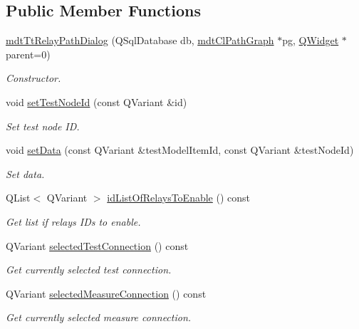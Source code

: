\subsection*{Public Member Functions}
\begin{DoxyCompactItemize}
\item 
\hyperlink{classmdt_tt_relay_path_dialog_a985f0940fd360d21c8cbcb89119ab916}{mdt\-Tt\-Relay\-Path\-Dialog} (Q\-Sql\-Database db, \hyperlink{classmdt_cl_path_graph}{mdt\-Cl\-Path\-Graph} $\ast$pg, \hyperlink{class_q_widget}{Q\-Widget} $\ast$parent=0)
\begin{DoxyCompactList}\small\item\em Constructor. \end{DoxyCompactList}\item 
void \hyperlink{classmdt_tt_relay_path_dialog_a0047cfd2fea5de76b8a9bf26a67ee45a}{set\-Test\-Node\-Id} (const Q\-Variant \&id)
\begin{DoxyCompactList}\small\item\em Set test node I\-D. \end{DoxyCompactList}\item 
void \hyperlink{classmdt_tt_relay_path_dialog_a188683b80701b54c0691d99bd3e8fe68}{set\-Data} (const Q\-Variant \&test\-Model\-Item\-Id, const Q\-Variant \&test\-Node\-Id)
\begin{DoxyCompactList}\small\item\em Set data. \end{DoxyCompactList}\item 
Q\-List$<$ Q\-Variant $>$ \hyperlink{classmdt_tt_relay_path_dialog_a540948fa111834c1abadafc71048f07c}{id\-List\-Of\-Relays\-To\-Enable} () const 
\begin{DoxyCompactList}\small\item\em Get list if relays I\-Ds to enable. \end{DoxyCompactList}\item 
Q\-Variant \hyperlink{classmdt_tt_relay_path_dialog_a6e9667d6626b6f4d0f87aa3b48bc598e}{selected\-Test\-Connection} () const 
\begin{DoxyCompactList}\small\item\em Get currently selected test connection. \end{DoxyCompactList}\item 
Q\-Variant \hyperlink{classmdt_tt_relay_path_dialog_a8d7b6fb36558f60f9ff09a89b92002dc}{selected\-Measure\-Connection} () const 
\begin{DoxyCompactList}\small\item\em Get currently selected measure connection. \end{DoxyCompactList}\end{DoxyCompactItemize}


